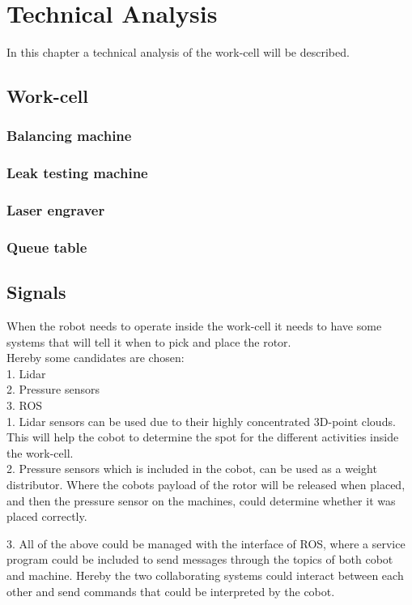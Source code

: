  \chapter{Technical Analysis} \label{TechAnalysis}
 
 In this chapter a technical analysis of the work-cell will be described.\\
 
 \section{Work-cell}
 
 \subsection{Balancing machine}
 
 \subsection{Leak testing machine}
 
 \subsection{Laser engraver}
 
 \subsection{Queue table}
 
 \section{Signals}
 
 When the robot needs to operate inside the work-cell it needs to have some systems that will tell it when to pick and place the rotor.\\
 Hereby some candidates are chosen:\\
 1. Lidar\\
 2. Pressure sensors\\
 3. ROS\\
 
 1. Lidar sensors can be used due to their highly concentrated 3D-point clouds. This will help the cobot to determine the spot for the different activities inside the work-cell.\\
 
 2. Pressure sensors which is included in the cobot, can be used as a weight distributor. Where the cobots payload of the rotor will be released when placed, and then the pressure sensor on the machines, could determine whether it was placed correctly.\\
 
 3. All of the above could be managed with the interface of ROS, where a service program could be included to send messages through the topics of both cobot and machine. Hereby the two collaborating systems could interact between each other and send commands that could be interpreted by the cobot.\\
 